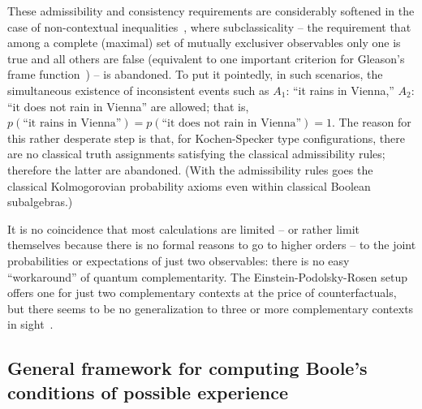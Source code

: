 These admissibility and consistency requirements are considerably softened in the case of non-contextual inequalities~\cite{cabello:210401},
where subclassicality
-- the requirement that among a complete (maximal) set of mutually exclusiver observables only one is true and all others are false
(equivalent to one important criterion for Gleason's frame function~\cite{Gleason})
--
is abandoned.
To put it pointedly, in such scenarios, the simultaneous existence of inconsistent events such as
$A_1$: ``it rains in Vienna,''
$A_2$: ``it does not rain in Vienna''
are allowed; that is,
$p(\text{``it rains in Vienna''}) = p(\text{``it does not rain in Vienna''}) =1$.
The reason for this rather desperate step is that, for Kochen-Specker type configurations,
there are no classical truth assignments satisfying the classical admissibility rules;
therefore the latter are abandoned.
(With the admissibility rules goes the classical Kolmogorovian probability axioms even within classical Boolean subalgebras.)


It is no coincidence that most calculations are limited -- or rather limit themselves because there is no formal reasons to go to higher orders
--
to the joint probabilities or expectations of just two observables:
there is no easy ``workaround'' of quantum complementarity.
The Einstein-Podolsky-Rosen setup~\cite{epr}
offers one for just two complementary contexts at the price of counterfactuals,
but there seems to be no generalization to three or more complementary contexts in sight~\cite{schimpf-svozil}.


\subsection{General framework for computing Boole's conditions of possible experience}
\label{2017-b-gfcbcpe}

